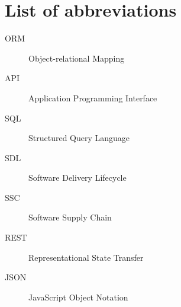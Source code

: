 \documentclass[../Main/thesis.tex]{subfiles}
\begin{document}
\chapter*{List of abbreviations}
\begin{description}
\item[ORM] Object-relational Mapping
\item[API] Application Programming Interface
\item[SQL] Structured Query Language
\item[SDL] Software Delivery Lifecycle
\item[SSC] Software Supply Chain
\item[REST] Representational State Transfer
\item[JSON] JavaScript Object Notation
\end{description}

\blankpage
\end{document}
